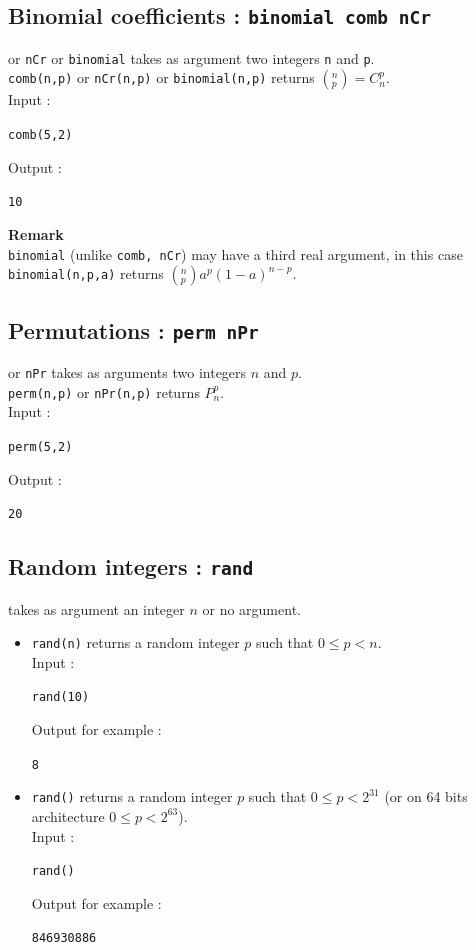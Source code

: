 \documentclass[a4paper,11pt]{book}
\begin{document}
\subsection{Binomial coefficients : {\tt binomial comb nCr}}
 or {\tt nCr} or {\tt binomial} takes as argument two 
integers {\tt n} and {\tt p}.\\
{\tt comb(n,p)} or {\tt nCr(n,p)} or {\tt binomial(n,p)}  returns 
$\left(^n_p\right) =C_n^p$.\\
Input :
\begin{center}{\tt comb(5,2)}\end{center}
Output :
\begin{center}{\tt 10}\end{center}
{\bf Remark}\\
{\tt binomial} (unlike {\tt comb, nCr}) 
may have a third real argument,
in this case {\tt binomial(n,p,a)} returns 
$\left(^n_p\right) a^p(1-a)^{n-p}$.

\subsection{Permutations : {\tt perm nPr}}
 or {\tt nPr} takes as arguments two integers $n$ and $p$.\\
{\tt perm(n,p)} or {\tt nPr(n,p)} returns $P_n^p$.\\
Input :
\begin{center}{\tt perm(5,2)}\end{center}
Output :
\begin{center}{\tt 20}\end{center}

\subsection{Random integers : {\tt rand}}
 takes as argument an integer $n$ or no argument.
\begin{itemize}
\item {\tt rand(n)} returns a random integer $p$ such that $0 \leq p<n$.\\   
Input :
\begin{center}{\tt rand(10)}\end{center}
Output for example :
\begin{center}{\tt 8}\end{center}

\item {\tt rand()} returns a random integer $p$ such that $0 \leq p<2^{31}$ 
(or on 64 bits architecture $0 \leq p<2^{63}$).\\ 
Input :
\begin{center}{\tt rand()}\end{center}
Output for example :
\begin{center}{\tt 846930886}\end{center}
\end{itemize}
\end{document}
